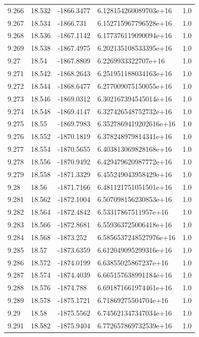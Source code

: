 \begin{tabular}{lllll}
9.266 & 18.532 & -1866.3477 & 6.128154260089703e+16 & 1.0 \\
9.267 & 18.534 & -1866.731 & 6.152715967796528e+16 & 1.0 \\
9.268 & 18.536 & -1867.1142 & 6.177376119090094e+16 & 1.0 \\
9.269 & 18.538 & -1867.4975 & 6.202135108533395e+16 & 1.0 \\
9.27 & 18.54 & -1867.8809 & 6.2269933322707e+16 & 1.0 \\
9.271 & 18.542 & -1868.2643 & 6.251951188034163e+16 & 1.0 \\
9.272 & 18.544 & -1868.6477 & 6.277009075150055e+16 & 1.0 \\
9.273 & 18.546 & -1869.0312 & 6.302167394545014e+16 & 1.0 \\
9.274 & 18.548 & -1869.4147 & 6.327426548752732e+16 & 1.0 \\
9.275 & 18.55 & -1869.7983 & 6.3527869419202616e+16 & 1.0 \\
9.276 & 18.552 & -1870.1819 & 6.378248979814341e+16 & 1.0 \\
9.277 & 18.554 & -1870.5655 & 6.403813069828168e+16 & 1.0 \\
9.278 & 18.556 & -1870.9492 & 6.429479620987772e+16 & 1.0 \\
9.279 & 18.558 & -1871.3329 & 6.455249043958429e+16 & 1.0 \\
9.28 & 18.56 & -1871.7166 & 6.481121751051501e+16 & 1.0 \\
9.281 & 18.562 & -1872.1004 & 6.507098156230853e+16 & 1.0 \\
9.282 & 18.564 & -1872.4842 & 6.53317867511957e+16 & 1.0 \\
9.283 & 18.566 & -1872.8681 & 6.559363725006418e+16 & 1.0 \\
9.284 & 18.568 & -1873.252 & 6.5856537248527976e+16 & 1.0 \\
9.285 & 18.57 & -1873.6359 & 6.612049095299316e+16 & 1.0 \\
9.286 & 18.572 & -1874.0199 & 6.63855025867237e+16 & 1.0 \\
9.287 & 18.574 & -1874.4039 & 6.665157638991184e+16 & 1.0 \\
9.288 & 18.576 & -1874.788 & 6.691871661974461e+16 & 1.0 \\
9.289 & 18.578 & -1875.1721 & 6.71869275504704e+16 & 1.0 \\
9.29 & 18.58 & -1875.5562 & 6.745621347347034e+16 & 1.0 \\
9.291 & 18.582 & -1875.9404 & 6.772657869732539e+16 & 1.0 \\

\end{tabular}
